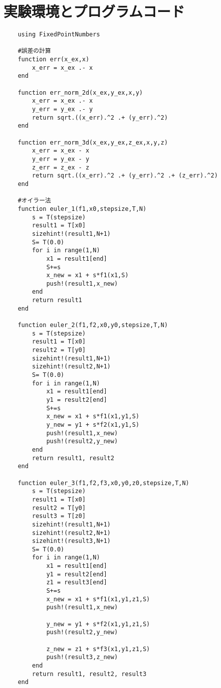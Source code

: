 \chapter{実験環境とプログラムコード}


\begin{lstlisting}
    using FixedPointNumbers

    #誤差の計算
    function err(x_ex,x)
        x_err = x_ex .- x
    end

    function err_norm_2d(x_ex,y_ex,x,y)
        x_err = x_ex .- x
        y_err = y_ex .- y
        return sqrt.((x_err).^2 .+ (y_err).^2)
    end

    function err_norm_3d(x_ex,y_ex,z_ex,x,y,z)
        x_err = x_ex - x
        y_err = y_ex - y
        z_err = z_ex - z
        return sqrt.((x_err).^2 .+ (y_err).^2 .+ (z_err).^2)
    end

    #オイラー法
    function euler_1(f1,x0,stepsize,T,N) 
        s = T(stepsize)
        result1 = T[x0]
        sizehint!(result1,N+1)
        S= T(0.0)
        for i in range(1,N)
            x1 = result1[end]
            S+=s
            x_new = x1 + s*f1(x1,S)
            push!(result1,x_new)
        end
        return result1
    end

    function euler_2(f1,f2,x0,y0,stepsize,T,N)
        s = T(stepsize)
        result1 = T[x0]
        result2 = T[y0]
        sizehint!(result1,N+1)
        sizehint!(result2,N+1)
        S= T(0.0)
        for i in range(1,N)
            x1 = result1[end]
            y1 = result2[end]
            S+=s
            x_new = x1 + s*f1(x1,y1,S)
            y_new = y1 + s*f2(x1,y1,S)
            push!(result1,x_new)
            push!(result2,y_new)
        end
        return result1, result2
    end

    function euler_3(f1,f2,f3,x0,y0,z0,stepsize,T,N)
        s = T(stepsize)
        result1 = T[x0]
        result2 = T[y0]
        result3 = T[z0]
        sizehint!(result1,N+1)
        sizehint!(result2,N+1)
        sizehint!(result3,N+1)
        S= T(0.0)
        for i in range(1,N)
            x1 = result1[end]
            y1 = result2[end]
            z1 = result3[end]
            S+=s
            x_new = x1 + s*f1(x1,y1,z1,S)
            push!(result1,x_new)

            y_new = y1 + s*f2(x1,y1,z1,S)
            push!(result2,y_new)

            z_new = z1 + s*f3(x1,y1,z1,S)
            push!(result3,z_new)
        end
        return result1, result2, result3
    end


\end{lstlisting}
